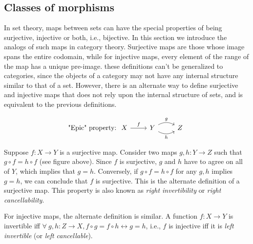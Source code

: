 \subsection{Classes of morphisms}

In set theory, maps between sets can have the special properties of
being surjective, injective or both, i.e., bijective. In this section
we introduce the analogs of such maps in category theory. Surjective
maps are those whose image spans the entire codomain, while for injective
maps, every element of the range of the map has a unique pre-image.
these definitions can't be generalized to categories, since the objects
of a category may not have any internal structure similar to that
of a set. However, there is an alternate way to define surjective
and injective maps that does not rely upon the internal structure
of sets, and is equivalent to the previous definitions.

\[\text{"Epic" property:}\; 
\begin{tikzcd} 
X \arrow[r, "f"] & Y \arrow[r, bend left, "g"] \arrow[r, bend right, "h"'] & Z 
\end{tikzcd}\]

Suppose $f:X\rightarrow Y$ is a surjective map. Consider two maps
$g,h:Y\rightarrow Z$ such that $g\circ f=h\circ f$ (see figure above).
Since $f$ is surjective, $g$ and $h$ have to agree on all of $Y$,
which implies that $g=h$. Conversely, if $g\circ f=h\circ f$ for
any $g,h$ implies $g=h$, we can conclude that $f$ is surjective.
This is the alternate definition of a surjective map. This property
is also known as \emph{right invertibility} or \emph{right cancellability}.

For injective maps, the alternate definition is similar. A function
$f:X\rightarrow Y$ is invertible iff $\forall~g,h:Z\rightarrow X,f\circ g=f\circ h\longleftrightarrow g=h$,
i.e., $f$ is injective iff it is \emph{left invertible} (or \emph{left
cancellable}).

